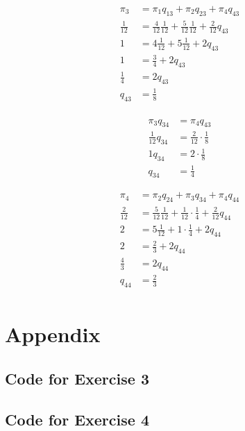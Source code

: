 \documentclass[12pt]{article}
\begin{document}
\begin{align*}
	\pi_3 &= \pi_1 q_{13} + \pi_2 q_{23} + \pi_4 q_{43} \\
	\frac{1}{12} &= \frac{4}{12} \frac{1}{12} + \frac{5}{12} \frac{1}{12}+ \frac{2}{12} q_{43} \\
	1 &= 4 \frac{1}{12} + 5 \frac{1}{12} + 2 q_{43} \\
	1 &= \frac{3}{4} + 2 q_{43} \\
	\frac{1}{4} &= 2 q_{43} \\
	q_{43} &= \frac{1}{8} \\
\end{align*}

\begin{align*}
	\pi_3 q_{34} &= \pi_4 q_{43} \\
	\frac{1}{12} q_{34} &= \frac{2}{12} \cdot \frac{1}{8} \\
	1 q_{34} &= 2 \cdot \frac{1}{8} \\
	q_{34} &= \frac{1}{4}
\end{align*}

\begin{align*}
	\pi_4 &= \pi_2 q_{24} + \pi_3 q_{34} + \pi_4 q_{44} \\
	\frac{2}{12} &= \frac{5}{12} \frac{1}{12} + \frac{1}{12} \cdot \frac{1}{4} + \frac{2}{12} q_{44} \\
	2 &= 5 \frac{1}{12} + 1 \cdot \frac{1}{4} + 2 q_{44} \\
	2 &= \frac{2}{3} + 2 q_{44} \\
	\frac{4}{3} &= 2 q_{44} \\
	q_{44} &= \frac{2}{3} \\
\end{align*}


\section*{Appendix}\label{appendix}
\subsection*{Code for Exercise 3}

\subsection*{Code for Exercise 4}

\end{document}
